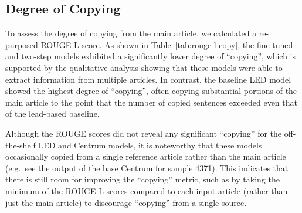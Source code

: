\documentclass[12pt, twocolumn]{article}
\numberwithin{equation}{section}
\begin{document}
\subsection{Degree of Copying}
\label{ssec:results-copy}

To assess the degree of copying from the main article, we calculated a re-purposed ROUGE-L score. As shown in Table~\ref{tab:rouge-l-copy}, the fine-tuned and two-step models exhibited a significantly lower degree of ``copying'', which is supported by the qualitative analysis showing that these models were able to extract information from multiple articles. In contrast, the baseline LED model showed the highest degree of ``copying'', often copying substantial portions of the main article to the point that the number of copied sentences exceeded even that of the lead-based baseline.

Although the ROUGE scores did not reveal any significant ``copying'' for the off-the-shelf LED and Centrum models, it is noteworthy that these models occasionally copied from a single reference article rather than the main article (e.g.~see the output of the base Centrum for sample 4371). This indicates that there is still room for improving the ``copying'' metric, such as by taking the minimum of the ROUGE-L scores compared to each input article (rather than just the main article) to discourage ``copying'' from a single source.
\end{document}
